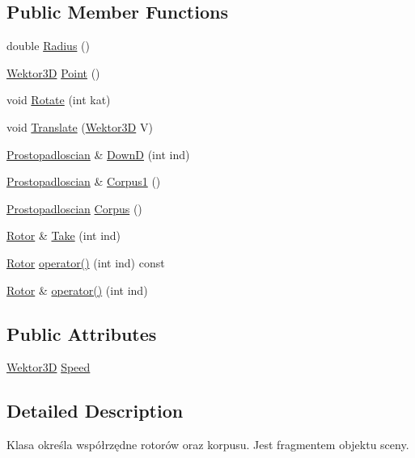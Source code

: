 \subsection*{Public Member Functions}
\begin{DoxyCompactItemize}
\item 
double \hyperlink{class_dron_a3d1518d64638aaa98519d240b6455c8c}{Radius} ()
\item 
\hyperlink{_wektor3_d_8hh_ac353a272b38b4ad342f7181ad7bdb91a}{Wektor3D} \hyperlink{class_dron_ae217b4b77f300658ade9817dbc3d0ffa}{Point} ()
\item 
void \hyperlink{class_dron_ae59a8da00fb889c8f97ae08b21a184f9}{Rotate} (int kat)
\item 
void \hyperlink{class_dron_ac9b37f92a345cce27dbc7c16cd40ce27}{Translate} (\hyperlink{_wektor3_d_8hh_ac353a272b38b4ad342f7181ad7bdb91a}{Wektor3D} V)
\item 
\hyperlink{class_prostopadloscian}{Prostopadloscian} \& \hyperlink{class_dron_ad7c1cbee3550365921052076d7345e5f}{DownD} (int ind)
\item 
\hyperlink{class_prostopadloscian}{Prostopadloscian} \& \hyperlink{class_dron_ad6273a0942af9e85cf4fa039b36a1f05}{Corpus1} ()
\item 
\hyperlink{class_prostopadloscian}{Prostopadloscian} \hyperlink{class_dron_accc0e928bc7c9c66c779793fd41a81ee}{Corpus} ()
\item 
\hyperlink{class_rotor}{Rotor} \& \hyperlink{class_dron_a7e22e894b00020b62884cfce45850336}{Take} (int ind)
\item 
\hyperlink{class_rotor}{Rotor} \hyperlink{class_dron_a7ba22c83868cd96769061597d1d0ad25}{operator()} (int ind) const
\item 
\hyperlink{class_rotor}{Rotor} \& \hyperlink{class_dron_a0eb520dc02cf3b2df93d5ce5cf240dbc}{operator()} (int ind)
\end{DoxyCompactItemize}
\subsection*{Public Attributes}
\begin{DoxyCompactItemize}
\item 
\hyperlink{_wektor3_d_8hh_ac353a272b38b4ad342f7181ad7bdb91a}{Wektor3D} \hyperlink{class_dron_af79b620c5f561d94e0e53b8f79bc66c7}{Speed}
\end{DoxyCompactItemize}


\subsection{Detailed Description}
Klasa określa współrzędne rotorów oraz korpusu. Jest fragmentem objektu sceny. 

